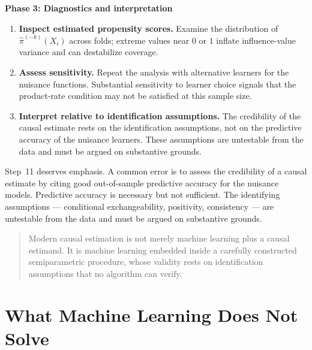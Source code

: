 \documentclass[master.tex]{subfiles}
\begin{document}
\begin{tcolorbox}[defstyle, title={Workflow: Cross-Fitted Causal Estimation}]
\medskip
\textbf{Phase 3: Diagnostics and interpretation}
\begin{enumerate}[resume]
  \item \textbf{Inspect estimated propensity scores.}  Examine the
    distribution of $\hat\pi^{(-k)}(X_i)$ across folds; extreme
    values near $0$ or $1$ inflate influence-value variance and can
    destabilize coverage.
  \item \textbf{Assess sensitivity.}  Repeat the analysis with
    alternative learners for the nuisance functions.  Substantial
    sensitivity to learner choice signals that the product-rate
    condition may not be satisfied at this sample size.
  \item \textbf{Interpret relative to identification assumptions.}
    The credibility of the causal estimate rests on the
    identification assumptions, not on the predictive accuracy of
    the nuisance learners.  These assumptions are untestable from
    the data and must be argued on substantive grounds.
\end{enumerate}
\end{tcolorbox}

Step~11 deserves emphasis.  A common error is to assess the
credibility of a causal estimate by citing good out-of-sample
predictive accuracy for the nuisance models.  Predictive accuracy
is necessary but not sufficient.  The identifying assumptions ---
conditional exchangeability, positivity, consistency --- are
untestable from the data and must be argued on substantive grounds.

\begin{quote}
  Modern causal estimation is not merely machine learning plus a
  causal estimand.  It is machine learning embedded inside a
  carefully constructed semiparametric procedure, whose validity
  rests on identification assumptions that no algorithm can verify.
\end{quote}


\section{What Machine Learning Does Not Solve}
\label{w11:sec:limits}
\end{document}
